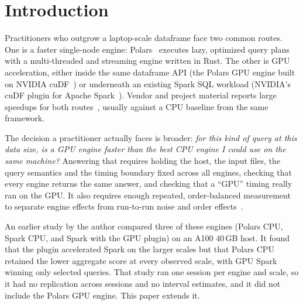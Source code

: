 \documentclass[11pt]{article}
\begin{document}
\section{Introduction}
\label{sec:intro}

Practitioners who outgrow a laptop-scale dataframe face two common routes. One
is a faster single-node engine: Polars~\citep{polars1442} executes lazy,
optimized query plans with a multi-threaded and streaming engine written in
Rust. The other is GPU acceleration, either inside the same dataframe API (the
Polars GPU engine built on NVIDIA cuDF~\citep{polars_gpu_guide,cudf_polars_docs})
or underneath an existing Spark SQL workload (NVIDIA's cuDF plugin for Apache
Spark~\citep{nvidia_cudf_spark_docs}). Vendor and project material reports
large speedups for both routes~\citep{semaan2024polarsgpu,nvidia_spark_benchmarks},
usually against a CPU baseline from the same framework.

The decision a practitioner actually faces is broader: \emph{for this kind of
query at this data size, is a GPU engine faster than the best CPU engine I could
use on the same machine?} Answering that requires holding the host, the input
files, the query semantics and the timing boundary fixed across all engines,
checking that every engine returns the same answer, and checking that a ``GPU''
timing really ran on the GPU. It also requires enough repeated, order-balanced
measurement to separate engine effects from run-to-run noise and order
effects~\citep{mytkowicz2009wrong,kalibera2013rigorous,hoefler2015scientific,raasveldt2018fair}.

An earlier study by the author compared three of these engines (Polars CPU,
Spark CPU, and Spark with the GPU plugin) on an A100 40\,GB host. It found that
the plugin accelerated Spark on the larger scales but that Polars CPU retained
the lower aggregate score at every observed scale, with GPU Spark winning only
selected queries. That study ran one session per engine and scale, so it
had no replication across sessions and no interval estimates, and it did not
include the Polars GPU engine. This paper extends it.
\end{document}
